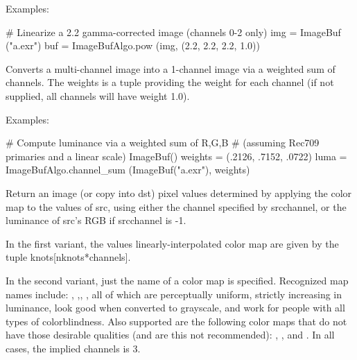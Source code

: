 \smallskip
\noindent Examples:
\begin{code}
    # Linearize a 2.2 gamma-corrected image (channels 0-2 only)
    img = ImageBuf ("a.exr")
    buf = ImageBufAlgo.pow (img, (2.2, 2.2, 2.2, 1.0))
\end{code}
\apiend


 
Converts a multi-channel image into a 1-channel image via a weighted sum
of channels. The {\cf weights} is a tuple providing the weight for each 
channel (if not supplied, all channels will have weight 1.0).

\smallskip
\noindent Examples:
\begin{code}
    # Compute luminance via a weighted sum of R,G,B
    # (assuming Rec709 primaries and a linear scale)
    ImageBuf()
    weights = (.2126, .7152, .0722)
    luma = ImageBufAlgo.channel_sum (ImageBuf("a.exr"), weights)
\end{code}
\apiend


 
Return an image (or copy into {\cf dst}) pixel values determined by applying
the color map to the values of {\cf src}, using either the channel specified
by {\cf srcchannel}, or the luminance of {\cf src}'s RGB if {\cf srcchannel}
is -1.

In the first variant, the values linearly-interpolated color map are
given by the tuple {\cf knots[nknots*channels]}.

In the second variant, just the name of a color map is specified. Recognized
map names include: , ,, ,
all of which are perceptually uniform, strictly increasing in luminance,
look good when converted to grayscale, and work for people with all types of
colorblindness. Also supported are the following color maps that do not have
those desirable qualities (and are this not recommended): ,
, and . In all cases, the implied {\cf channels} is
3.

